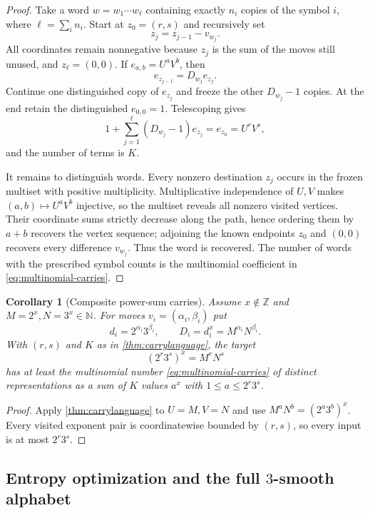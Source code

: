 \documentclass[11pt,oneside]{article}
\newtheorem{corollary}[theorem]{Corollary}
\theoremstyle{definition}
\newcommand{\Z}{\mathbb{Z}}
\newcommand{\N}{\mathbb{N}}
\begin{document}
\begin{proof}
Take a word $w=w_1\cdots w_\ell$ containing exactly $n_i$ copies of the symbol $i$, where $\ell=\sum_i n_i$.  Start at
$z_0=(r,s)$ and recursively set
\[
       z_j=z_{j-1}-v_{w_j}.
\]
All coordinates remain nonnegative because $z_j$ is the sum of the moves still unused, and $z_\ell=(0,0)$.  If
$e_{a,b}=U^aV^b$, then
\[
       e_{z_{j-1}}=D_{w_j}e_{z_j}.
\]
Continue one distinguished copy of $e_{z_j}$ and freeze the other
$D_{w_j}-1$ copies.  At the end retain the distinguished $e_{0,0}=1$.
Telescoping gives
\[
  1+\sum_{j=1}^{\ell}(D_{w_j}-1)e_{z_j}
  =e_{z_0}=U^rV^s,
\]
and the number of terms is $K$.

It remains to distinguish words.  Every nonzero destination $z_j$ occurs in the frozen multiset with positive multiplicity.  Multiplicative independence of $U,V$ makes $(a,b)\mapsto U^aV^b$ injective, so the multiset reveals all nonzero visited vertices.  Their coordinate sums strictly decrease along the path, hence ordering them by $a+b$ recovers the vertex sequence; adjoining the known endpoints $z_0$ and $(0,0)$ recovers every difference $v_{w_j}$.  Thus the word is recovered.  The number of words with the prescribed symbol counts is the multinomial coefficient in \eqref{eq:multinomial-carries}.
\end{proof}

\begin{corollary}[Composite power-sum carries]\label{cor:compositepowercarries}
Assume $x\notin\Z$ and $M=2^x,N=3^x\in\N$.  For moves
$v_i=(\alpha_i,\beta_i)$ put
\[
       d_i=2^{\alpha_i}3^{\beta_i},
       \qquad D_i=d_i^x=M^{\alpha_i}N^{\beta_i}.
\]
With $(r,s)$ and $K$ as in \cref{thm:carrylanguage}, the target
\[
       (2^r3^s)^x=M^rN^s
\]
has at least the multinomial number \eqref{eq:multinomial-carries} of distinct representations as a sum of $K$ values $a^x$ with
$1\le a\le 2^r3^s$.
\end{corollary}

\begin{proof}
Apply \cref{thm:carrylanguage} to $U=M,V=N$ and use
$M^aN^b=(2^a3^b)^x$.  Every visited exponent pair is coordinatewise bounded by $(r,s)$, so every input is at most $2^r3^s$.
\end{proof}

\subsection{Entropy optimization and the full \texorpdfstring{$3$}{3}-smooth alphabet}
\end{document}
